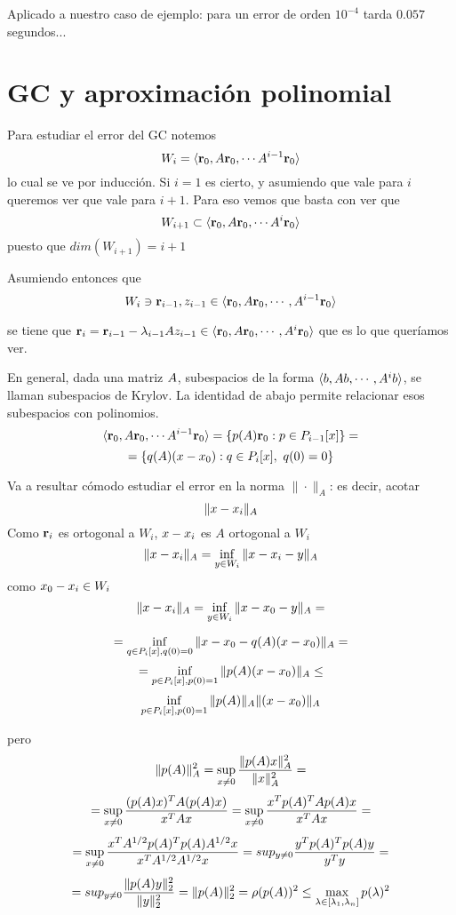 Aplicado a nuestro caso de ejemplo: para un error de orden $10^{-4}$ tarda $0.057$ segundos...
\section{GC y aproximación polinomial}
Para estudiar el error del GC notemos
$$
W_i=\langle \rb_0, \Ab\rb_0, \cdots \Ab^{i-1}\rb_0\rangle
$$
lo cual se ve por inducción. Si $i=1$ es cierto, y asumiendo que vale para $i$ queremos ver que vale para $i+1$. Para eso vemos que basta con ver que
$$
W_{i+1}\subset
\langle \rb_0, \Ab\rb_0, \cdots \Ab^{i}\rb_0\rangle
$$
puesto que $dim(W_{i+1})=i+1$

Asumiendo entonces que
$$W_{i}\ni \rb_{i-1},\zb_{i-1}\in \langle \rb_0, \Ab\rb_0, \cdots ,\Ab^{i-1}\rb_0\rangle$$



se tiene que  $\rb_{i}=\rb_{i-1}-\lambda_{i-1}\Ab\zb_{i-1}\in \langle \rb_0, \Ab\rb_0, \cdots ,\Ab^{i}\rb_0\rangle$
que es lo que queríamos ver.

En general, dada una matriz $\Ab$, subespacios de la forma
$\langle \bb, \Ab\bb, \cdots ,\Ab^{i}\bb\rangle$, se llaman subespacios
de Krylov. La identidad de abajo permite relacionar esos subespacios con polinomios.
$$\langle \rb_0, \Ab\rb_0, \cdots \Ab^{i-1}\rb_0\rangle=\{ p(\Ab)\rb_0: p\in P_{i-1}[x]\}=$$
$$=\{ q(\Ab)(\xb-\xb_0): q\in P_{i}[x],\ q(0)=0\}$$

Va a resultar cómodo estudiar el error en la norma $\|\cdot\|_A$: es decir,  acotar
$$
\|\xb-\xb_i\|_{A}$$
Como $\mathbf{r}_i$ es ortogonal a $W_i$, $\xb-\xb_i
$ es $A$ ortogonal a $W_i$
$$
\|\xb-\xb_i\|_{A}=\inf_{\yb\in W_i}\|\xb-\xb_i-\yb\|_{A}
$$
como $\xb_0-\xb_i\in W_i$
$$
\|\xb-\xb_i\|_{A}=\inf_{\yb\in W_i}
\|\xb-\xb_0-\yb\|_{A}
=$$

$$
=\inf_{q\in P_{i}[x],q(0)=0}\|\xb-\xb_0-q(\Ab)(\xb-\xb_0)\|_{A}
=$$
$$
=\inf_{p\in P_i[x],p(0)=1}\|p(\Ab)(\xb-\xb_0)\|_{A}
\le$$
$$
\inf_{p\in P_i[x],p(0)=1}\|p(\Ab)\|_{A}\|(\xb-\xb_0)\|_{A}
$$

pero
$$
\|p(\Ab)\|_A^2=\sup_{\xb\neq\cero}\frac{\|p(\Ab)\xb\|_A^2}{\|\xb\|_A^2}=
$$
$$=\sup_{\xb\neq\cero}\frac{(p(\Ab)\xb)^T\Ab (p(\Ab)\xb)}{\xb^T\Ab\xb}=\sup_{\xb\neq\cero}\frac{\xb^T p(\Ab)^T\Ab p(\Ab)\xb}{\xb^T\Ab\xb}=
$$
$$
=\sup_{\xb\neq\cero}\frac{\xb^T\Ab^{1/2} p(\Ab)^T p(\Ab)\Ab^{1/2}\xb}{\xb^T\Ab^{1/2}\Ab^{1/2}\xb}=sup_{\yb\neq\cero}\frac{\yb^T p(\Ab)^T p(\Ab)\yb}{\yb^T\yb}
=$$
$$
=sup_{\yb\neq\cero}\frac{ \|p(\Ab)\yb\|_2^2}{\|\yb\|^2_2}
=\|p(\Ab)\|_2^2=\rho(p(\Ab))^2\le \max_{\lambda\in [\lambda_1,\lambda_n]}p(\lambda)^2$$

